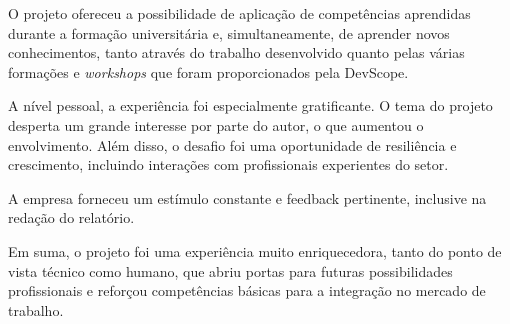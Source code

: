 O projeto ofereceu a possibilidade de aplicação de competências aprendidas durante a formação universitária e, simultaneamente, de aprender novos conhecimentos, tanto através do trabalho desenvolvido quanto pelas várias formações e \textit{workshops} que foram proporcionados pela DevScope.

A nível pessoal, a experiência foi especialmente gratificante. O tema do projeto desperta um grande interesse por parte do autor, o que aumentou o envolvimento. Além disso, o desafio foi uma oportunidade de resiliência e crescimento, incluindo interações com profissionais experientes do setor.

A empresa forneceu um estímulo constante e feedback pertinente, inclusive na redação do relatório.

Em suma, o projeto foi uma experiência muito enriquecedora, tanto do ponto de vista técnico como humano, que abriu portas para futuras possibilidades profissionais e reforçou competências básicas para a integração no mercado de trabalho.